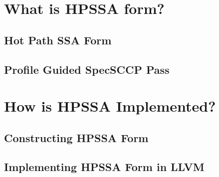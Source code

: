 \documentclass[aspectratio=169, compress]{beamer}
\begin{document}
\section{What is HPSSA form?}
\subsection{Hot Path SSA Form}
{
	
}
\subsection{Profile Guided SpecSCCP Pass}
{
	
}
\footnotesize

\section{How is HPSSA Implemented?}
\subsection{Constructing HPSSA Form}
{
	
}
{
	
}
\subsection{Implementing HPSSA Form in LLVM}
\end{document}
